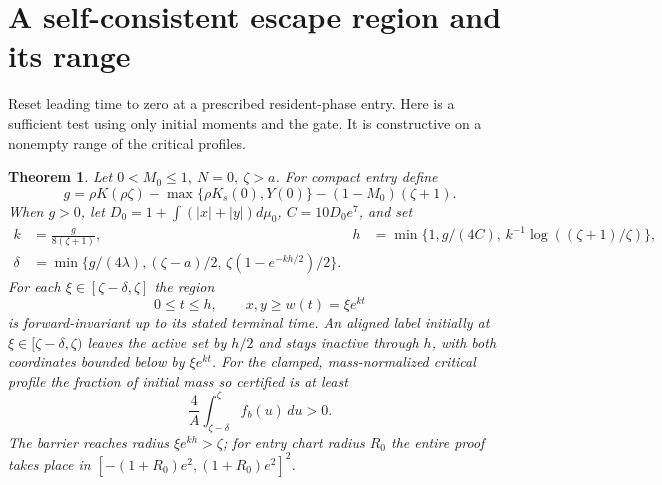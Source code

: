 \documentclass[11pt]{article}
\newtheorem{theorem}{Theorem}\newtheorem{lemma}{Lemma}
\begin{document}
\section{A self-consistent escape region and its range}\label{an04rpsv1:escape}
Reset leading time to zero at a prescribed resident-phase entry.
Here is a sufficient test using only initial moments and the gate.
It is constructive on a nonempty range of the critical profiles.
\begin{theorem}\label{an04rpsv1:cone}
Let \(0<M_0\le1,\ N=0,\ \zeta>a\). For compact entry define
\[
 g=\rho K(\rho\zeta)-\max\{\rho K_s(0),Y(0)\}
                          -(1-M_0)(\zeta+1).
\]
When \(g>0\), let \(D_0=1+\int(|x|+|y|)d\mu_0\),
\(C=10D_0e^7\), and set
\begin{align*}
 k&=\frac{g}{8(\zeta+1)},&
 h&=\min\{1,g/(4C),\,k^{-1}\log((\zeta+1)/\zeta)\},\\
 \delta&=\min\{g/(4\lambda),(\zeta-a)/2,\,
                         \zeta(1-e^{-kh/2})/2\}.
\end{align*}
For each \(\xi\in[\zeta-\delta,\zeta]\) the region
\[
 0\le t\le h,\qquad x,y\ge w(t)=\xi e^{kt}
\]
is forward-invariant up to its stated terminal time. An aligned label
initially at \(\xi\in[\zeta-\delta,\zeta)\) leaves the active set by
\(h/2\) and stays inactive through \(h\), with both coordinates bounded
below by \(\xi e^{kt}\). For the clamped, mass-normalized critical
profile the fraction of initial mass so certified is at least
\begin{equation}\label{an04rpsv1:moved}
 \frac4A\int_{\zeta-\delta}^{\zeta} f_b(u)\,du>0.
\end{equation}
The barrier reaches radius \(\xi e^{kh}>\zeta\); for entry chart radius
\(R_0\) the entire proof takes place in
\([-(1+R_0)e^2,(1+R_0)e^2]^2\).
\end{theorem}
\end{document}
